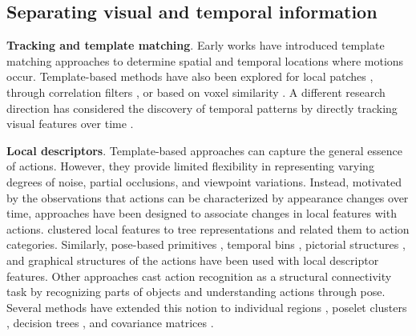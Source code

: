 \subsection{Separating visual and temporal information}
\label{sec:modeling::separate}

\noindent
\textbf{Tracking and template matching}. Early works \citep{bobick2001recognition} have introduced template matching approaches to determine spatial and temporal locations where motions occur. Template-based methods have also been explored for local patches \citep{shechtman2005space}, through correlation filters \citep{rodriguez2008action}, or based on voxel similarity \citep{ke2007spatio}. A different research direction has considered the discovery of temporal patterns by directly tracking visual features over time \citep{cipolla1990dynamic,isard1998condensation,rohr1994towards}. 


\noindent
\textbf{Local descriptors}. Template-based approaches can capture the general essence of actions. However, they provide limited flexibility in representing varying degrees of noise, partial occlusions, and viewpoint variations. Instead, motivated by the observations that actions can be characterized by appearance changes over time, approaches have been designed to associate changes in local features with actions. \citet{mikolajczyk2008action} clustered local features to tree representations and related them to action categories. Similarly, pose-based primitives \citep{thurau2008pose}, temporal bins \citep{nowozin2007discriminative}, pictorial structures \citep{tran2012part}, and graphical structures of the actions \citep{ni2014multiple} have been used with local descriptor features. Other approaches \citep{gupta2009observing,yao2010modeling} cast action recognition as a structural connectivity task by recognizing parts of objects and understanding actions through pose.
Several methods have extended this notion to individual regions \citep{ikizler2010object}, poselet clusters \citep{pishchulin2013strong}, decision trees \citep{rahmani2014real}, and covariance matrices \citep{kviatkovsky2014online}.


